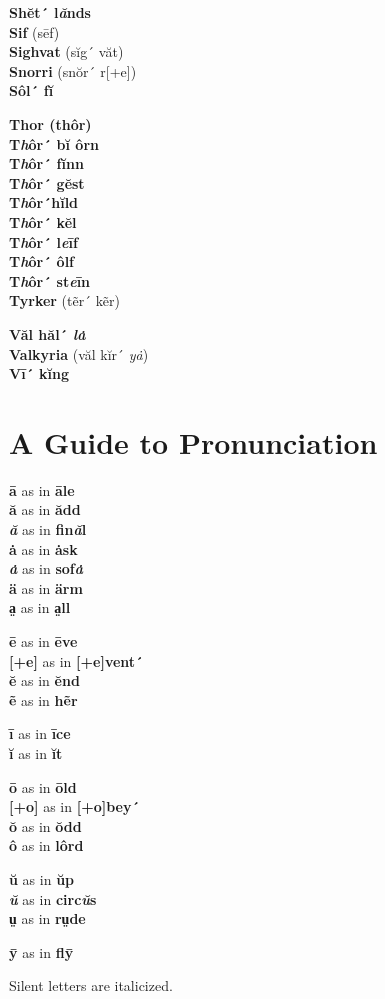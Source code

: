 \begin{multicols}{3}
\noindent\textbf{Shĕt´ l\emph{ă}nds}\\
\textbf{Sif} (sēf)\\
\textbf{Sighvat} (sĭg´ văt)\\
\textbf{Snorri} (snŏr´ r{[}+e{]})\\
\textbf{Sôl´ fĭ}

\noindent\textbf{Thor (thôr)}\\
\textbf{T\emph{h}ôr´ bĭ ôrn}\\
\textbf{T\emph{h}ôr´ fĭnn}\\
\textbf{T\emph{h}ôr´ gĕst}\\
\textbf{T\emph{h}ôr´hĭld}\\
\textbf{T\emph{h}ôr´ kĕl}\\
\textbf{T\emph{h}ôr´ l\emph{e}īf}\\
\textbf{T\emph{h}ôr´ ôlf}\\
\textbf{T\emph{h}ôr´ st\emph{e}īn}\\
\textbf{Tyrker} (tẽr´ kẽr)

\noindent\textbf{Văl hăl´ \emph{lȧ}}\\
\textbf{Valkyria} (văl kĭr´ \emph{yȧ})\\
\textbf{Vī´ kĭng}
\end{multicols}

\section*{A Guide to Pronunciation}

\begin{multicols}{3}
\noindent\textbf{ā} as in \textbf{āle}\\
\textbf{ă} as in \textbf{ădd}\\
\textbf{\emph{ă}} as in \textbf{fin\emph{ă}l}\\
\textbf{ȧ} as in \textbf{ȧsk}\\
\textbf{\emph{ȧ}} as in \textbf{sof\emph{ȧ}}\\
\textbf{ä} as in \textbf{ärm}\\
\textbf{a̤} as in \textbf{a̤ll}

\noindent\textbf{ē} as in \textbf{ēve}\\
\textbf{{[}+e{]}} as in \textbf{{[}+e{]}vent´}\\
\textbf{ĕ} as in \textbf{ĕnd}\\
\textbf{ẽ} as in \textbf{hẽr}

\noindent\textbf{ī} as in \textbf{īce}\\
\textbf{ĭ} as in \textbf{ĭt}

\noindent\textbf{ō} as in \textbf{ōld}\\
\textbf{{[}+o{]}} as in \textbf{{[}+o{]}bey´}\\
\textbf{ŏ} as in \textbf{ŏdd}\\
\textbf{ô} as in \textbf{lôrd}

\noindent\textbf{ŭ} as in \textbf{ŭp}\\
\textbf{\emph{ŭ}} as in \textbf{circ\emph{ŭ}s}\\
\textbf{ṳ} as in \textbf{rṳde}

\noindent\textbf{ȳ} as in \textbf{flȳ}
\end{multicols}

\noindent Silent letters are italicized.
